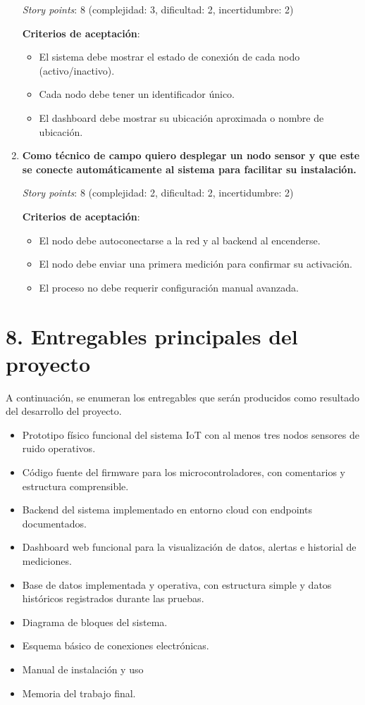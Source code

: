 \documentclass[
11pt, %
]{charter}
\begin{document}
\begin{enumerate}
    \textit{Story points}: 8 (complejidad: 3, dificultad: 2, incertidumbre: 2)

    \textbf{Criterios de aceptación}:
    \begin{itemize}
        \item El sistema debe mostrar el estado de conexión de cada nodo (activo/inactivo).
        \item Cada nodo debe tener un identificador único.
        \item El dashboard debe mostrar su ubicación aproximada o nombre de ubicación.
    \end{itemize}

    \item \textbf{Como técnico de campo quiero desplegar un nodo sensor y que este se conecte automáticamente al sistema para facilitar su instalación.}

    \textit{Story points}: 8 (complejidad: 2, dificultad: 2, incertidumbre: 2)

    \textbf{Criterios de aceptación}:
    \begin{itemize}
        \item El nodo debe autoconectarse a la red y al backend al encenderse.
        \item El nodo debe enviar una primera medición para confirmar su activación.
        \item El proceso no debe requerir configuración manual avanzada.
    \end{itemize}
\end{enumerate}

\section{8. Entregables principales del proyecto}
\label{sec:entregables}

A continuación, se enumeran los entregables que serán producidos como resultado del desarrollo del proyecto. 

\begin{itemize}
    \item Prototipo físico funcional del sistema IoT con al menos tres nodos sensores de ruido operativos.
    \item Código fuente del firmware para los microcontroladores, con comentarios y estructura comprensible.
    \item Backend del sistema implementado en entorno cloud con endpoints documentados.
    \item Dashboard web funcional para la visualización de datos, alertas e historial de mediciones.
    \item Base de datos implementada y operativa, con estructura simple y datos históricos registrados durante las pruebas.
    \item Diagrama de bloques del sistema.
    \item Esquema básico de conexiones electrónicas.
    \item Manual de instalación y uso
    \item Memoria del trabajo final.
    
\end{itemize}
\end{document}
